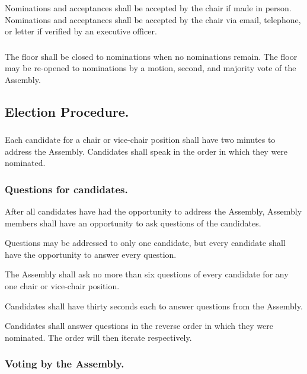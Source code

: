 \subsubsection{}
Nominations and acceptances shall be accepted by the chair if made in person.  Nominations and acceptances shall be accepted by the chair via email, telephone, or letter if verified by an executive officer.

\subsubsection{}
The floor shall be closed to nominations when no nominations remain.  The floor may be re-opened to nominations by a motion, second, and majority vote of the Assembly.  


\subsection{Election Procedure.}

\subsubsection{}
Each candidate for a chair or vice-chair position shall have two minutes to address the Assembly.  Candidates shall speak in the order in which they were nominated.

\subsubsection{Questions for candidates.}

\subsubsubsection{}
After all candidates have had the opportunity to address the Assembly, Assembly members shall have an opportunity to ask questions of the candidates.

\subsubsubsection{}
Questions may be addressed to only one candidate, but every candidate shall have the opportunity to answer every question.

\subsubsubsection{}
The Assembly shall ask no more than six questions of every candidate for any one chair or vice-chair position.

\subsubsubsection{}
Candidates shall have thirty seconds each to answer questions from the Assembly.

\subsubsubsection{}
Candidates shall answer questions in the reverse order in which they were nominated.  The order will then iterate respectively.

\subsubsection{Voting by the Assembly.}

